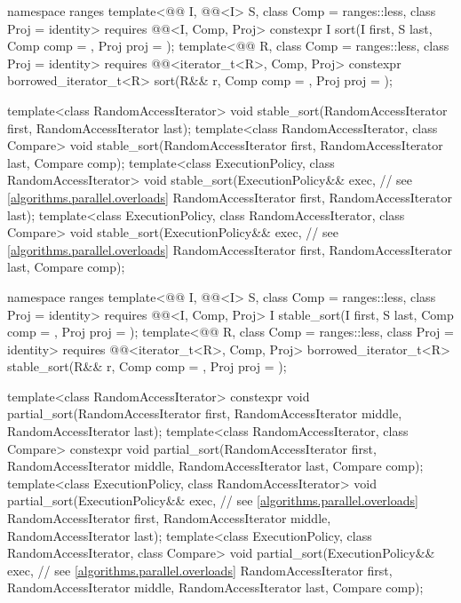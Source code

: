 \begin{codeblock}
{  namespace ranges {
    template<@@ I, @@<I> S, class Comp = ranges::less,
             class Proj = identity>
      requires @@<I, Comp, Proj>
      constexpr I
        sort(I first, S last, Comp comp = {}, Proj proj = {});
    template<@@ R, class Comp = ranges::less, class Proj = identity>
      requires @@<iterator_t<R>, Comp, Proj>
      constexpr borrowed_iterator_t<R>
        sort(R&& r, Comp comp = {}, Proj proj = {});
  }

  template<class RandomAccessIterator>
    void stable_sort(RandomAccessIterator first, RandomAccessIterator last);
  template<class RandomAccessIterator, class Compare>
    void stable_sort(RandomAccessIterator first, RandomAccessIterator last,
                     Compare comp);
  template<class ExecutionPolicy, class RandomAccessIterator>
    void stable_sort(ExecutionPolicy&& exec,                    // see \ref{algorithms.parallel.overloads}
                     RandomAccessIterator first, RandomAccessIterator last);
  template<class ExecutionPolicy, class RandomAccessIterator, class Compare>
    void stable_sort(ExecutionPolicy&& exec,                    // see \ref{algorithms.parallel.overloads}
                     RandomAccessIterator first, RandomAccessIterator last,
                     Compare comp);

  namespace ranges {
    template<@@ I, @@<I> S, class Comp = ranges::less,
             class Proj = identity>
      requires @@<I, Comp, Proj>
      I stable_sort(I first, S last, Comp comp = {}, Proj proj = {});
    template<@@ R, class Comp = ranges::less, class Proj = identity>
      requires @@<iterator_t<R>, Comp, Proj>
      borrowed_iterator_t<R>
        stable_sort(R&& r, Comp comp = {}, Proj proj = {});
  }

  template<class RandomAccessIterator>
    constexpr void partial_sort(RandomAccessIterator first, RandomAccessIterator middle,
                                RandomAccessIterator last);
  template<class RandomAccessIterator, class Compare>
    constexpr void partial_sort(RandomAccessIterator first, RandomAccessIterator middle,
                                RandomAccessIterator last, Compare comp);
  template<class ExecutionPolicy, class RandomAccessIterator>
    void partial_sort(ExecutionPolicy&& exec,                   // see \ref{algorithms.parallel.overloads}
                      RandomAccessIterator first, RandomAccessIterator middle,
                      RandomAccessIterator last);
  template<class ExecutionPolicy, class RandomAccessIterator, class Compare>
    void partial_sort(ExecutionPolicy&& exec,                   // see \ref{algorithms.parallel.overloads}
                      RandomAccessIterator first, RandomAccessIterator middle,
                      RandomAccessIterator last, Compare comp);

}
\end{codeblock}
